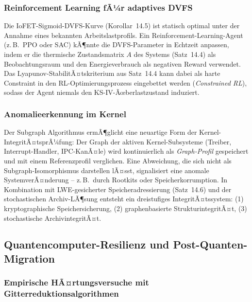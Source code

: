 ﻿\documentclass[a4paper,12pt]{scrreprt}
\theoremstyle{definition}
\begin{document}
	\subsubsection{Reinforcement Learning fÃ¼r adaptives DVFS}
	
	Die IoFET-Sigmoid-DVFS-Kurve (Korollar~14.5) ist statisch optimal
	unter der Annahme eines bekannten Arbeitslastprofils. Ein Reinforcement-Learning-Agent
	(z.\,B.\ PPO oder SAC) kÃ¶nnte die DVFS-Parameter in Echtzeit anpassen,
	indem er die thermische Zustandsmatrix $A$ des Systems (Satz~14.4)
	als Beobachtungsraum und den Energieverbrauch als negativen Reward verwendet.
	Das Lyapunov-StabilitÃ¤tskriterium aus Satz~14.4 kann dabei als
	harte Constraint in den RL-Optimierungsprozess eingebettet werden
	(\emph{Constrained RL}), sodass der Agent niemals den KS-IV-Ãœberlastzustand
	induziert.
	
	\subsubsection{Anomalieerkennung im Kernel}
	
	Der Subgraph Algorithmus \cite{Epp2026subgraph} ermÃ¶glicht eine neuartige
	Form der Kernel-IntegritÃ¤tsprÃ¼\-fung: Der Graph der aktiven Kernel-Subsysteme
	(Treiber, Interrupt-Handler, IPC-KanÃ¤le) wird kontinuierlich als
	\emph{Graph-Profil} gespeichert und mit einem Referenzprofil verglichen.
	Eine Abweichung, die sich nicht als Subgraph-Isomorphismus darstellen lÃ¤sst,
	signalisiert eine anomale SystemverÃ¤nderung -- z.\,B.\ durch Rootkits oder
	Speicherkorrumption. In Kombination mit LWE-gesicherter Speicheradressierung
	(Satz~14.6) und der stochastischen Archiv-LÃ¶sung \cite{Epp2026archv}
	entsteht ein dreistufiges IntegritÃ¤tssystem:
	(1) kryptographische Speichersicherung,
	(2) graphenbasierte StrukturintegritÃ¤t,
	(3) stochastische ArchivintegritÃ¤t.
	
	\subsection{Quantencomputer-Resilienz und Post-Quanten-Migration}
	
	\subsubsection{Empirische HÃ¤rtungsversuche mit Gitterreduktionsalgorithmen}
	
\end{document}
